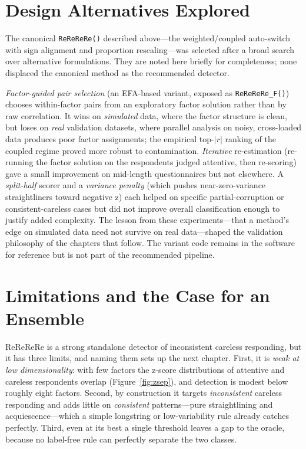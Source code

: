 \documentclass[doc,11pt,donotrepeattitle]{apa7}
\begin{document}
\section{Design Alternatives Explored}

The canonical \texttt{ReReReRe()} described above---the weighted/coupled
auto-switch with sign alignment and proportion rescaling---was selected after a
broad search over alternative formulations. They are noted here briefly for
completeness; none displaced the canonical method as the recommended detector.

\emph{Factor-guided pair selection} (an EFA-based variant, exposed as
\texttt{ReReReRe\_F()}) chooses within-factor pairs from an exploratory factor
solution rather than by raw correlation. It wins on \emph{simulated} data, where
the factor structure is clean, but loses on \emph{real} validation datasets,
where parallel analysis on noisy, cross-loaded data produces poor factor
assignments; the empirical top-$|r|$ ranking of the coupled regime proved more
robust to contamination. \emph{Iterative} re-estimation (re-running the factor
solution on the respondents judged attentive, then re-scoring) gave a small
improvement on mid-length questionnaires but not elsewhere. A \emph{split-half}
scorer and a \emph{variance penalty} (which pushes near-zero-variance
straightliners toward negative z) each helped on specific partial-corruption or
consistent-careless cases but did not improve overall classification enough to
justify added complexity. The lesson from these experiments---that a method's
edge on simulated data need not survive on real data---shaped the validation
philosophy of the chapters that follow. The variant code remains in the software
for reference but is not part of the recommended pipeline.

\section{Limitations and the Case for an Ensemble}

ReReReRe is a strong standalone detector of inconsistent careless responding,
but it has three limits, and naming them sets up the next chapter. First, it is
\emph{weak at low dimensionality}: with few factors the z-score distributions of
attentive and careless respondents overlap (Figure~\ref{fig:zsep}), and
detection is modest below roughly eight factors. Second, by construction it
targets \emph{inconsistent} careless responding and adds little on
\emph{consistent} patterns---pure straightlining and acquiescence---which a
simple longstring or low-variability rule already catches perfectly. Third, even
at its best a single threshold leaves a gap to the oracle, because no
label-free rule can perfectly separate the two classes.
\end{document}
